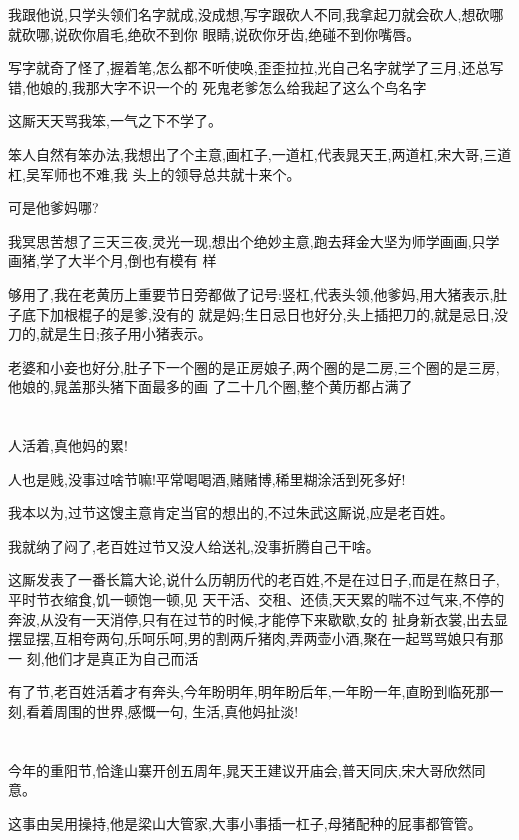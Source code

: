 ﻿\documentclass[12pt]{article}
\begin{document}
我跟他说,只学头领们名字就成,没成想,写字跟砍人不同,我拿起刀就会砍人,想砍哪就砍哪,说砍你眉毛,绝砍不到你
眼睛,说砍你牙齿,绝碰不到你嘴唇。

写字就奇了怪了,握着笔,怎么都不听使唤,歪歪拉拉,光自己名字就学了三月,还总写错,他娘的,我那大字不识一个的
死鬼老爹怎么给我起了这么个鸟名字

这厮天天骂我笨,一气之下不学了。

笨人自然有笨办法,我想出了个主意,画杠子,一道杠,代表晁天王,两道杠,宋大哥,三道杠,吴军师\dldots 也不难,我
头上的领导总共就十来个。

可是他爹妈哪?

我冥思苦想了三天三夜,灵光一现,想出个绝妙主意,跑去拜金大坚为师学画画,只学画猪,学了大半个月,倒也有模有
样

够用了,我在老黄历上重要节日旁都做了记号:竖杠,代表头领,他爹妈,用大猪表示,肚子底下加根棍子的是爹,没有的
就是妈;生日忌日也好分,头上插把刀的,就是忌日,没刀的,就是生日;孩子用小猪表示。

老婆和小妾也好分,肚子下一个圈的是正房娘子,两个圈的是二房,三个圈的是三房,他娘的,晁盖那头猪下面最多的画
了二十几个圈,整个黄历都占满了\dldots

\section{}

人活着,真他妈的累!

人也是贱,没事过啥节嘛!平常喝喝酒,赌赌博,稀里糊涂活到死多好!

我本以为,过节这馊主意肯定当官的想出的,不过朱武这厮说,应是老百姓。

我就纳了闷了,老百姓过节又没人给送礼,没事折腾自己干啥。

这厮发表了一番长篇大论,说什么历朝历代的老百姓,不是在过日子,而是在熬日子,平时节衣缩食,饥一顿饱一顿,见
天干活、交租、还债,天天累的喘不过气来,不停的奔波,从没有一天消停,只有在过节的时候,才能停下来歇歇,女的
扯身新衣裳,出去显摆显摆,互相夸两句,乐呵乐呵,男的割两斤猪肉,弄两壶小酒,聚在一起骂骂娘\dldots 只有那一
刻,他们才是真正为自己而活

有了节,老百姓活着才有奔头,今年盼明年,明年盼后年,一年盼一年,直盼到临死那一刻,看着周围的世界,感慨一句,
生活,真他妈扯淡!
\section{}

今年的重阳节,恰逢山寨开创五周年,晁天王建议开庙会,普天同庆,宋大哥欣然同意。

这事由吴用操持,他是梁山大管家,大事小事插一杠子,母猪配种的屁事都管管。
\end{document}
